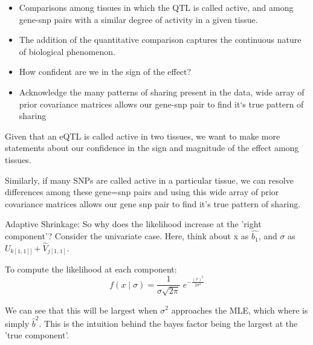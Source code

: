 \documentclass[10pt,letterpaper]{article}
\begin{document}
\begin{itemize}

\item Comparisons among tissues in which the QTL is called active, and among gene-snp pairs with a similar degree of activity in a given tissue. 
\item The addition of the quantitative comparison captures the continuous nature of biological phenomenon. %
\item How confident are we in the sign of the effect?
\item Acknowledge the many patterns of sharing present in the data, wide array of prior covariance matrices allows our gene-snp pair to find it`s true pattern of sharing


\end{itemize}

Given that an eQTL is called active in two tissues, we want to make more statements about our confidence in the sign and magnitude of the effect among tissues. 

Similarly, if many SNPs are called active  in a particular tissue, we can resolve differences among these gene=snp pairs  and using this wide array of prior covariance matrices allows our gene snp pair to find it's true pattern of sharing. 

\item{Adaptive Shrinkage: So why does the likelihood increase at the 'right component'?}
Consider the univariate case. Here, think about x as $\hat{b_{1}}$, and $\sigma$ as $U_{k[1,1]]} + \hat{V}_{j[1,1]}$.  

To compute the likelihood at each component: 
\begin{equation}
f(x \; | \; \sigma) = \frac{1}{\sigma\sqrt{2\pi} } \; e^{ -\frac{(x)^2}{2\sigma^2} }
\end{equation}
  
We can see that this will be largest when $\sigma^{2}$ approaches the MLE, which where is simply $\hat{b}^{2}$. 
This is the intuition behind the bayes factor being the largest at the 'true component'. 
\end{document}
